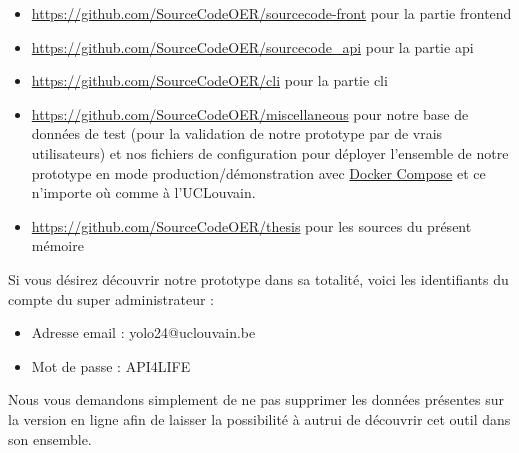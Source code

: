 \begin{itemize}
    \item \href{https://github.com/SourceCodeOER/sourcecode-front}{https://github.com/SourceCodeOER/sourcecode-front} pour la partie \gls{frontend}
    \item \href{https://github.com/SourceCodeOER/sourcecode\_api}{https://github.com/SourceCodeOER/sourcecode\_api} pour la partie \Gls{api}
    \item \href{https://github.com/SourceCodeOER/cli}{https://github.com/SourceCodeOER/cli} pour la partie \Gls{cli}
    \item \href{https://github.com/SourceCodeOER/miscellaneous}{https://github.com/SourceCodeOER/miscellaneous} pour notre base de données de test (pour la validation de notre prototype par de vrais utilisateurs) et nos fichiers de configuration pour déployer l'ensemble de notre prototype en mode production/démonstration avec \href{https://docs.docker.com/compose/}{Docker Compose} et ce n'importe où comme à l'UCLouvain.
    \item \href{https://github.com/SourceCodeOER/thesis}{https://github.com/SourceCodeOER/thesis} pour les sources du présent mémoire
\end{itemize}


Si vous désirez découvrir notre prototype dans sa totalité, voici les identifiants du compte du super administrateur : 
\begin{itemize}
    \item Adresse email : yolo24@uclouvain.be
    \item Mot de passe : API4LIFE
\end{itemize}
Nous vous demandons simplement de ne pas supprimer les données présentes sur la version en ligne afin de laisser la possibilité à autrui de découvrir cet outil dans son ensemble.
\fi
